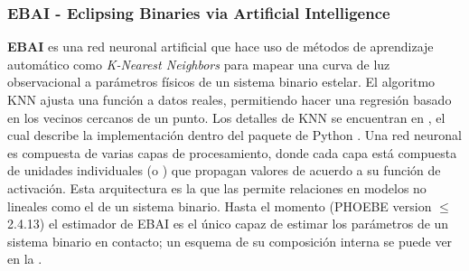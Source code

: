 \subsubsection{EBAI - Eclipsing Binaries via Artificial Intelligence}
\textbf{EBAI} es una red neuronal artificial que hace uso de métodos de
aprendizaje automático como \textit{K-Nearest Neighbors} para mapear una curva
de luz observacional a parámetros físicos de un sistema binario estelar. El
algoritmo KNN ajusta una función a datos reales, permitiendo hacer una regresión
basado en los vecinos cercanos de un punto. Los detalles de KNN se encuentran en
\autocite{pedregosa_scikit-learn_2011}, el cual describe la implementación
dentro del paquete de Python . Una red neuronal es compuesta
de varias capas de procesamiento, donde cada capa está compuesta de unidades
individuales (o ) que propagan valores de acuerdo a su función
de activación. Esta arquitectura es la que las permite 
relaciones en modelos no lineales como el de un sistema binario. Hasta el
momento (PHOEBE version $\leq$2.4.13) el estimador de EBAI es el único capaz de
estimar los parámetros de un sistema binario en contacto; un esquema de su
composición interna se puede ver en la .

